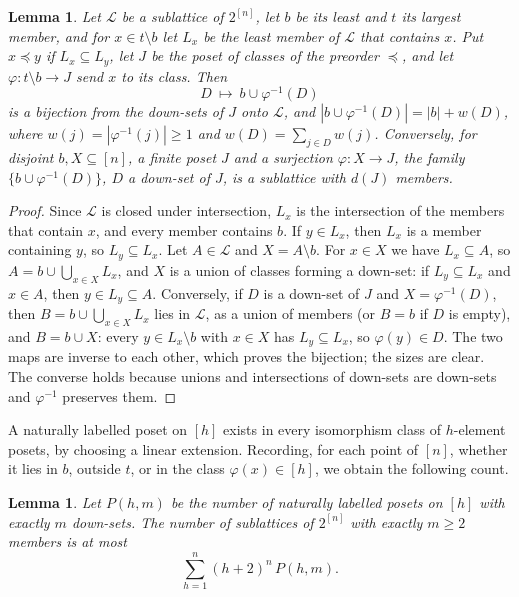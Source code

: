 \documentclass[11pt,reqno]{amsart}
\numberwithin{equation}{section}
\theoremstyle{plain}
\newtheorem{lemma}[theorem]{Lemma}
\theoremstyle{definition}
\theoremstyle{remark}
\newcommand{\cL}{\mathcal{L}}
\begin{document}
\begin{lemma}
\label{lem:birkhoff}
Let $\cL$ be a sublattice of $2^{[n]}$, let $b$ be its least and $t$ its
largest member, and for $x\in t\setminus b$ let $L_x$ be the least member
of $\cL$ that contains $x$. Put $x\preceq y$ if $L_x\subseteq L_y$, let $J$
be the poset of classes of the preorder $\preceq$, and let
$\varphi\colon t\setminus b\to J$ send $x$ to its class. Then
\[
D\ \longmapsto\ b\cup\varphi^{-1}(D)
\]
is a bijection from the down-sets of $J$ onto $\cL$, and $|b\cup
\varphi^{-1}(D)|=|b|+w(D)$, where $w(j)=|\varphi^{-1}(j)|\ge1$ and
$w(D)=\sum_{j\in D}w(j)$. Conversely, for disjoint $b,X\subseteq[n]$, a
finite poset $J$ and a surjection $\varphi\colon X\to J$, the family
$\{b\cup\varphi^{-1}(D)\}$, $D$ a down-set of $J$, is a sublattice with
$d(J)$ members.
\end{lemma}

\begin{proof}
Since $\cL$ is closed under intersection, $L_x$ is the intersection of the
members that contain $x$, and every member contains $b$. If $y\in L_x$,
then $L_x$ is a member containing $y$, so $L_y\subseteq L_x$. Let $A\in\cL$
and $X=A\setminus b$. For $x\in X$ we have $L_x\subseteq A$, so
$A=b\cup\bigcup_{x\in X}L_x$, and $X$ is a union of classes forming a
down-set: if $L_y\subseteq L_x$ and $x\in A$, then $y\in L_y\subseteq A$.
Conversely, if $D$ is a down-set of $J$ and $X=\varphi^{-1}(D)$, then
$B=b\cup\bigcup_{x\in X}L_x$ lies in $\cL$, as a union of members (or
$B=b$ if $D$ is empty), and $B=b\cup X$: every $y\in L_x\setminus b$ with
$x\in X$ has $L_y\subseteq L_x$, so $\varphi(y)\in D$. The two maps are
inverse to each other, which proves the bijection; the sizes are clear.
The converse holds because unions and intersections of down-sets are
down-sets and $\varphi^{-1}$ preserves them.
\end{proof}

A naturally labelled poset on $[h]$ exists in every isomorphism class of
$h$-element posets, by choosing a linear extension. Recording, for each
point of $[n]$, whether it lies in $b$, outside $t$, or in the class
$\varphi(x)\in[h]$, we obtain the following count.

\begin{lemma}
\label{lem:countsub}
Let $P(h,m)$ be the number of naturally labelled posets on $[h]$ with
exactly $m$ down-sets. The number of sublattices of $2^{[n]}$ with exactly
$m\ge2$ members is at most
\[
\sum_{h=1}^{n}(h+2)^{n}\,P(h,m).
\]
\end{lemma}
\end{document}
